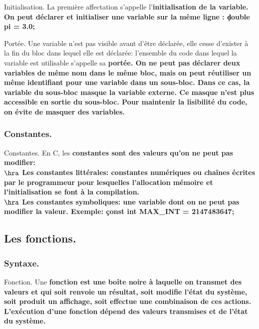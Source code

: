 \documentclass[french, 11pt]{article}
\begin{document}
\vspace*{-0.7cm}

\begin{defi}{Initialisation.}{}
    La première affectation s'appelle l'\bf{initialisation} de la variable.\\
    On peut déclarer et initialiser une variable sur la même ligne : \c{double pi = 3.0;}
\end{defi}

\vspace*{-0.7cm}

\begin{defi}{Portée.}{}
    Une variable n'est pas visible avant d'être déclarée, elle cesse d'exister à la fin du bloc dans lequel elle est déclarée: l'ensemble du code dans lequel la variable est utilisable s'appelle sa \bf{portée}.\n
    On ne peut pas déclarer deux variables de même nom dans le même bloc, mais on peut réutiliser un même identifiant pour une variable dans un sous-bloc. Dans ce cas, la variable du sous-bloc masque la variable externe. Ce masque n'est plus accessible en sortie du sous-bloc.\n
    Pour maintenir la lisibilité du code, on évite de masquer des variables.
\end{defi}

\subsubsection{Constantes.}

\begin{defi}{Constantes.}{}
    En C, les \bf{constantes} sont des valeurs qu'on ne peut pas modifier:\\
    $\hra$ Les constantes littérales: constantes numériques ou chaînes écrites par le programmeur pour lesquelles l'allocation mémoire et l'initialisation se font à la compilation.\\
    $\hra$ Les constantes symboliques: une variable dont on ne peut pas modifier la valeur.\n
    \bf{Exemple:} \c{const int MAX_INT = 2147483647;}
\end{defi}

\subsection{Les fonctions.}
\subsubsection{Syntaxe.}

\begin{defi}{Fonction.}{}
    Une \bf{fonction} est une boîte noire à laquelle on transmet des valeurs et qui soit renvoie un résultat, soit modifie l'état du système, soit produit un affichage, soit effectue une combinaison de ces actions.\n
    L'exécution d'une fonction dépend des valeurs transmises et de l'état du système.
\end{defi}
\end{document}
